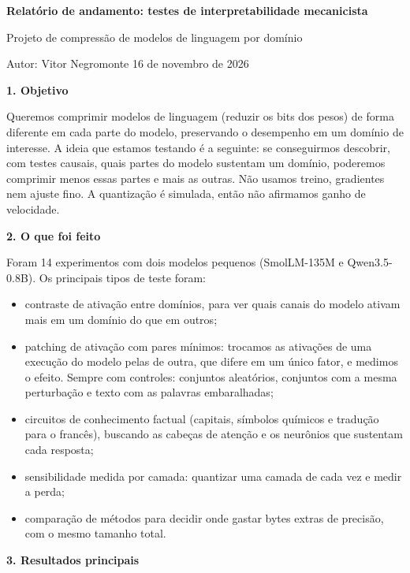 \documentclass[11pt,a4paper]{article}
\newcommand{\secao}[1]{\par\textbf{#1}\par\nopagebreak[4]}
\begin{document}
\textbf{\Large Relatório de andamento: testes de interpretabilidade mecanicista}

Projeto de compressão de modelos de linguagem por domínio

Autor: Vitor Negromonte \hfill 16 de novembro de 2026

\bigskip

\secao{1. Objetivo}

Queremos comprimir modelos de linguagem (reduzir os bits dos pesos) de forma diferente em cada parte do modelo, preservando o desempenho em um domínio de interesse. A ideia que estamos testando é a seguinte: se conseguirmos descobrir, com testes causais, quais partes do modelo sustentam um domínio, poderemos comprimir menos essas partes e mais as outras. Não usamos treino, gradientes nem ajuste fino. A quantização é simulada, então não afirmamos ganho de velocidade.

\secao{2. O que foi feito}

Foram 14 experimentos com dois modelos pequenos (SmolLM-135M e Qwen3.5-0.8B). Os principais tipos de teste foram:

\begin{itemize}
\item contraste de ativação entre domínios, para ver quais canais do modelo ativam mais em um domínio do que em outros;
\item patching de ativação com pares mínimos: trocamos as ativações de uma execução do modelo pelas de outra, que difere em um único fator, e medimos o efeito. Sempre com controles: conjuntos aleatórios, conjuntos com a mesma perturbação e texto com as palavras embaralhadas;
\item circuitos de conhecimento factual (capitais, símbolos químicos e tradução para o francês), buscando as cabeças de atenção e os neurônios que sustentam cada resposta;
\item sensibilidade medida por camada: quantizar uma camada de cada vez e medir a perda;
\item comparação de métodos para decidir onde gastar bytes extras de precisão, com o mesmo tamanho total.
\end{itemize}

\secao{3. Resultados principais}
\end{document}

